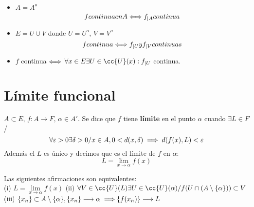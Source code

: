 \begin{prop} \\
    \begin{itemize}
        \item $A = A^o$ $$f \\ continua \\ en \\ A \Longleftrightarrow f_{|A} \\ continua$$
        \item $E = U \cup V$ donde $U = U^o$, $V = V^o$ 
        $$f \\ continua \Longleftrightarrow f_{|U} \\ y \\ f_{|V} \\ continuas$$
        \item $f$ continua $\Longleftrightarrow$ $\forall x \in E\\ \exists U \in \cc{U}(x) : f_{|U}$ continua.
    \end{itemize}
\end{prop}

\section{Límite funcional}
\begin{definicion}
    $A \subset E$, $f:A \longrightarrow F$, $\alpha \in A'$.
    Se dice que $f$ tiene \textbf{límite} en el punto $\alpha$ cuando $\exists L \in F$ /\\
    $$\forall \varepsilon >0 \\ \exists \delta > 0 \\ / \\ x \in A, 0 < d(x,\delta) \implies d (f(x), L) < \varepsilon$$
    Además el $L$ es único y decimos que es el límite de $f$ en $\alpha$:
    $$L = \lim_{x\to \alpha} f(x)$$
\end{definicion}

\begin{prop}[Caracterización]
    Las siguientes afirmaciones son equivalentes:\\
    (i) $L = \lim\limits_{x \to \alpha} f(x)$ \newline
    (ii) $\forall V \in \cc{U}(L) \\ \exists U \in \cc{U}(\alpha) \\ /\\ f(U\cap (A\setminus \{\alpha\})) \subset V$\newline
    (iii) $\{x_n\} \subset A\setminus \{\alpha\}, \\ \{x_n\} \longrightarrow \alpha \\ \implies \\ \{f(x_n)\} \longrightarrow L$
\end{prop}

